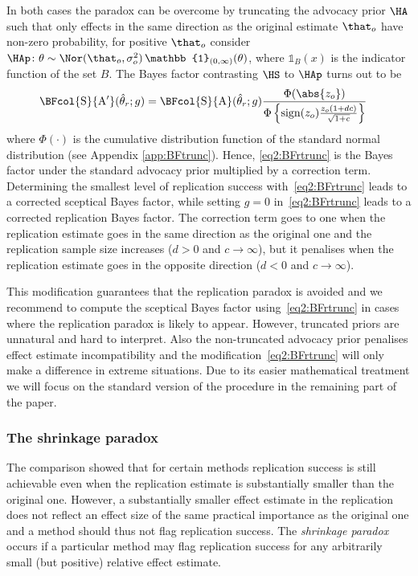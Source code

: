 In both cases the paradox can be overcome by truncating the advocacy prior $\HA$
such that only effects in the same direction as the original estimate $\that_o$
have non-zero probability, \ie{} for positive $\that_{o}$ consider
$\HAp \colon \theta \sim \Nor(\that_o, \sigma^2_o) \, \mathbb{1}_{(0, \infty)}(\theta)$,
where $\mathbb{1}_{B}(x)$ is the indicator function of the set $B$. The Bayes
factor contrasting $\HS$ to $\HAp$ turns out to be
\begin{align}
  \BFcol{\mathrm{S}}{\mathrm{A}^\prime}(\hat{\theta}_r; g)
  &= \BFcol{\mathrm{S}}{\mathrm{A}}(\hat{\theta}_r; g)
  \frac{\Phi(\abs{z_o})}{\Phi\left\{\mathrm{sign}(z_o)
    \frac{z_o(1 + dc)}{\sqrt{1 + c}} \right\}}
   \label{eq2:BFrtrunc}
\end{align}
where $\Phi(\cdot)$ is the cumulative distribution function of the standard
normal distribution (see Appendix \ref{app:BFtrunc}). Hence, \eqref{eq2:BFrtrunc}
is the Bayes factor under the standard advocacy prior multiplied by a correction
term. Determining the smallest level of replication success
with~\eqref{eq2:BFrtrunc} leads to a corrected sceptical Bayes factor, while
setting $g = 0$ in~\eqref{eq2:BFrtrunc} leads to a corrected replication Bayes
factor. The correction term goes to one when the replication estimate goes in
the same direction as the original one and the replication sample size increases
($d > 0$ and $c \to \infty$), but it penalises when the replication estimate
goes in the opposite direction ($d < 0$ and $c \to \infty$).

This modification guarantees that the replication paradox is avoided and we
recommend to compute the sceptical Bayes factor using~\eqref{eq2:BFrtrunc} in
cases where the replication paradox is likely to appear. However, truncated
priors are unnatural and hard to interpret. Also the non-truncated advocacy
prior penalises effect estimate incompatibility and the
modification~\eqref{eq2:BFrtrunc} will only make a difference in extreme
situations. Due to its easier mathematical treatment we will focus on the
standard version of the procedure in the remaining part of the paper.


\subsubsection{The shrinkage paradox}
The comparison showed that for certain methods replication success is still
achievable even when the replication estimate is substantially smaller than the
original one. However, a substantially smaller effect estimate in the
replication does not reflect an effect size of the same practical importance as
the original one and a method should thus not flag replication success. The {\em
shrinkage paradox} occurs if a particular method may flag replication success
for any arbitrarily small (but positive) relative effect estimate.

